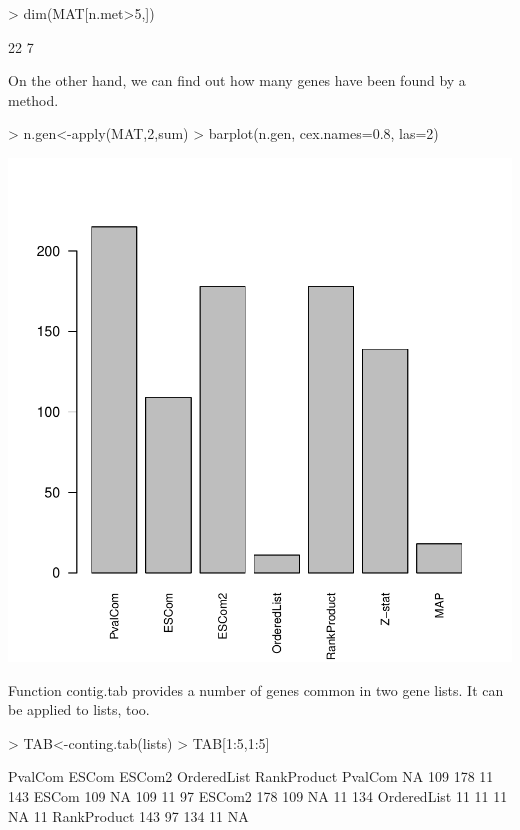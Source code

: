 \documentclass[a4paper]{report}
\begin{document}
\begin{Schunk}
\begin{Sinput}
> dim(MAT[n.met>5,])
\end{Sinput}
\begin{Soutput}
[1] 22  7
\end{Soutput}
\end{Schunk}
On the other hand, we can find out how many genes have been found by a method.
\begin{center}
\begin{Schunk}
\begin{Sinput}
> n.gen<-apply(MAT,2,sum)
> barplot(n.gen, cex.names=0.8, las=2)
\end{Sinput}
\end{Schunk}
\includegraphics{MAMA_full-073}
\end{center}
Function {\ttfamily contig.tab} provides a number of genes common in two gene lists. It can be applied to {\ttfamily lists}, too.
\begin{Schunk}
\begin{Sinput}
> TAB<-conting.tab(lists)
> TAB[1:5,1:5]
\end{Sinput}
\begin{Soutput}
            PvalCom ESCom ESCom2 OrderedList RankProduct
PvalCom          NA   109    178          11         143
ESCom           109    NA    109          11          97
ESCom2          178   109     NA          11         134
OrderedList      11    11     11          NA          11
RankProduct     143    97    134          11          NA
\end{Soutput}
\end{Schunk}
\end{document}
